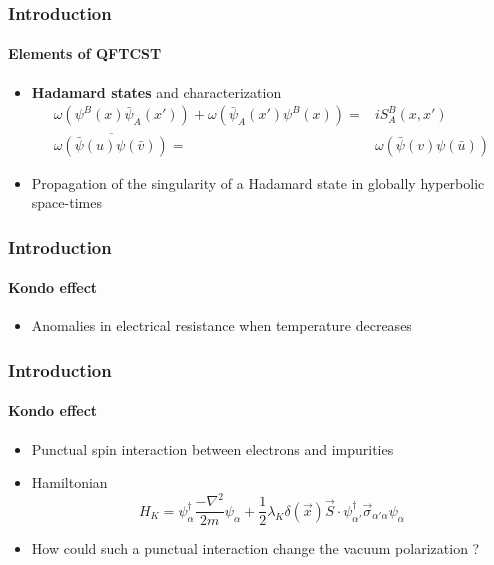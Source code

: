 \documentclass[french]{beamer}
\begin{document}
\begin{frame}
\frametitle{Introduction}
\framesubtitle{Elements of QFTCST}

\begin{itemize}

\item \textbf{Hadamard states} and characterization
 \begin{equation*}
\begin{split}
\omega(\psi^B(x)\bar{\psi}_A(x')) + \omega(\bar{\psi}_A(x')\psi^B(x)) = &
iS^B_A(x,x') \\
\overline{\omega(\bar{\psi}(u)\psi(\bar{v}))} = & \omega(\bar{\psi}(v)\psi(\bar{u}))
\end{split}
\end{equation*}

\item Propagation of the singularity of a Hadamard state in globally hyperbolic space-times

\end{itemize}

\end{frame}
\begin{frame}
\frametitle{Introduction}
\framesubtitle{Kondo effect}
\begin{itemize}
\item Anomalies in electrical resistance when temperature decreases

\end{itemize}

\end{frame}
\begin{frame}
\frametitle{Introduction}
\framesubtitle{Kondo effect}
\begin{itemize}
\item Punctual spin interaction between electrons and impurities
\item Hamiltonian
\begin{equation*}
H_K = \psi_\alpha^\dagger \frac{-\nabla^2}{2m}\psi_\alpha +
\frac 1 2\lambda_K \delta(\vec{x})\vec{S}\cdot \psi_{\alpha'}^\dagger  \vec{\sigma}_{\alpha' \alpha} \psi_\alpha
\end{equation*}

\item How could such a punctual interaction change the vacuum polarization ?
\end{itemize}

\end{frame}
\end{document}
